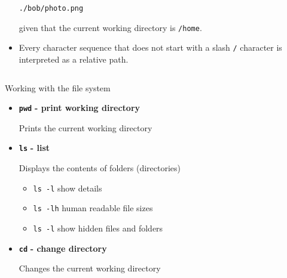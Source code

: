 \documentclass[aspectratio=1610]{beamer}
\newcommand\curtitle{}
\newcommand\command[1]{\alert{\textbf{\texttt{#1}}}}
\begin{document}
\begin{frame}[c]{\curtitle}
\begin{adjustwidth}{-2em}{-2em}
\begin{columns}
\begin{column}{0.70\textwidth}
\begin{itemize}[<+->]
                        \medskip\texttt{./bob/photo.png}

                        \medskip given that the current working directory is \texttt{/home}.
                    \item Every character sequence that does not start with a slash \alert{\texttt{/}} character
                        is interpreted as a relative path.
                \end{itemize}
            \end{column}
        \end{columns}
    \end{adjustwidth}
\end{frame}

\renewcommand\curtitle{Working with the file system}


\begin{frame}[c]{\curtitle}
    \begin{itemize}[<+->]
        \setlength\itemsep{1em}
        \item \command{pwd} \textbf{- print working directory} 

            Prints the current working directory
        \item \command{ls} \textbf{- list} 

            Displays the contents of folders (directories)
            \begin{itemize}[<.->]
                \item \alert{\texttt{ls -l}} show details
                \item \alert{\texttt{ls -lh}} human readable file sizes
                \item \alert{\texttt{ls -l}} show hidden files and folders
            \end{itemize}
        \item \command{cd} \textbf{- change directory} 

            Changes the current working directory
    \end{itemize}
\end{frame}

\end{document}
